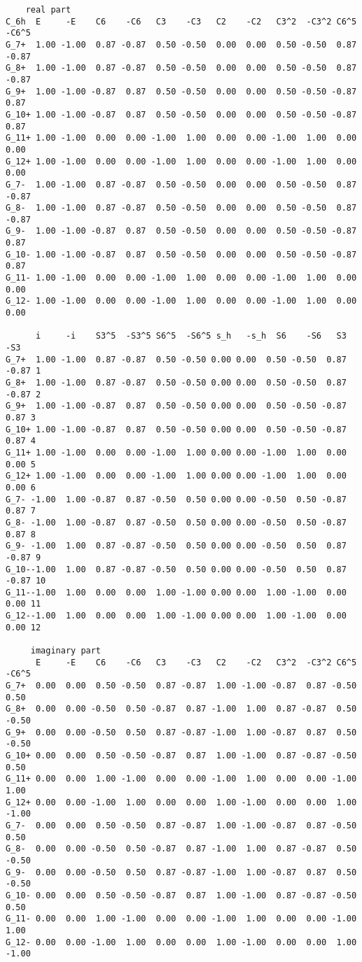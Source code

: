 \documentclass[12pt,a4paper,twoside]{report}
\begin{document}
\begin{tcolorbox}
\begin{scriptsize}
\begin{verbatim}
    real part
C_6h  E     -E    C6    -C6   C3    -C3   C2    -C2   C3^2  -C3^2 C6^5  -C6^5
G_7+  1.00 -1.00  0.87 -0.87  0.50 -0.50  0.00  0.00  0.50 -0.50  0.87 -0.87
G_8+  1.00 -1.00  0.87 -0.87  0.50 -0.50  0.00  0.00  0.50 -0.50  0.87 -0.87
G_9+  1.00 -1.00 -0.87  0.87  0.50 -0.50  0.00  0.00  0.50 -0.50 -0.87  0.87
G_10+ 1.00 -1.00 -0.87  0.87  0.50 -0.50  0.00  0.00  0.50 -0.50 -0.87  0.87
G_11+ 1.00 -1.00  0.00  0.00 -1.00  1.00  0.00  0.00 -1.00  1.00  0.00  0.00
G_12+ 1.00 -1.00  0.00  0.00 -1.00  1.00  0.00  0.00 -1.00  1.00  0.00  0.00
G_7-  1.00 -1.00  0.87 -0.87  0.50 -0.50  0.00  0.00  0.50 -0.50  0.87 -0.87
G_8-  1.00 -1.00  0.87 -0.87  0.50 -0.50  0.00  0.00  0.50 -0.50  0.87 -0.87
G_9-  1.00 -1.00 -0.87  0.87  0.50 -0.50  0.00  0.00  0.50 -0.50 -0.87  0.87
G_10- 1.00 -1.00 -0.87  0.87  0.50 -0.50  0.00  0.00  0.50 -0.50 -0.87  0.87
G_11- 1.00 -1.00  0.00  0.00 -1.00  1.00  0.00  0.00 -1.00  1.00  0.00  0.00
G_12- 1.00 -1.00  0.00  0.00 -1.00  1.00  0.00  0.00 -1.00  1.00  0.00  0.00

      i     -i    S3^5  -S3^5 S6^5  -S6^5 s_h   -s_h  S6    -S6   S3    -S3
G_7+  1.00 -1.00  0.87 -0.87  0.50 -0.50 0.00 0.00  0.50 -0.50  0.87 -0.87 1
G_8+  1.00 -1.00  0.87 -0.87  0.50 -0.50 0.00 0.00  0.50 -0.50  0.87 -0.87 2
G_9+  1.00 -1.00 -0.87  0.87  0.50 -0.50 0.00 0.00  0.50 -0.50 -0.87  0.87 3
G_10+ 1.00 -1.00 -0.87  0.87  0.50 -0.50 0.00 0.00  0.50 -0.50 -0.87  0.87 4
G_11+ 1.00 -1.00  0.00  0.00 -1.00  1.00 0.00 0.00 -1.00  1.00  0.00  0.00 5
G_12+ 1.00 -1.00  0.00  0.00 -1.00  1.00 0.00 0.00 -1.00  1.00  0.00  0.00 6
G_7- -1.00  1.00 -0.87  0.87 -0.50  0.50 0.00 0.00 -0.50  0.50 -0.87  0.87 7
G_8- -1.00  1.00 -0.87  0.87 -0.50  0.50 0.00 0.00 -0.50  0.50 -0.87  0.87 8
G_9- -1.00  1.00  0.87 -0.87 -0.50  0.50 0.00 0.00 -0.50  0.50  0.87 -0.87 9
G_10--1.00  1.00  0.87 -0.87 -0.50  0.50 0.00 0.00 -0.50  0.50  0.87 -0.87 10
G_11--1.00  1.00  0.00  0.00  1.00 -1.00 0.00 0.00  1.00 -1.00  0.00  0.00 11
G_12--1.00  1.00  0.00  0.00  1.00 -1.00 0.00 0.00  1.00 -1.00  0.00  0.00 12

     imaginary part
      E     -E    C6    -C6   C3    -C3   C2    -C2   C3^2  -C3^2 C6^5  -C6^5
G_7+  0.00  0.00  0.50 -0.50  0.87 -0.87  1.00 -1.00 -0.87  0.87 -0.50  0.50
G_8+  0.00  0.00 -0.50  0.50 -0.87  0.87 -1.00  1.00  0.87 -0.87  0.50 -0.50
G_9+  0.00  0.00 -0.50  0.50  0.87 -0.87 -1.00  1.00 -0.87  0.87  0.50 -0.50
G_10+ 0.00  0.00  0.50 -0.50 -0.87  0.87  1.00 -1.00  0.87 -0.87 -0.50  0.50
G_11+ 0.00  0.00  1.00 -1.00  0.00  0.00 -1.00  1.00  0.00  0.00 -1.00  1.00
G_12+ 0.00  0.00 -1.00  1.00  0.00  0.00  1.00 -1.00  0.00  0.00  1.00 -1.00
G_7-  0.00  0.00  0.50 -0.50  0.87 -0.87  1.00 -1.00 -0.87  0.87 -0.50  0.50
G_8-  0.00  0.00 -0.50  0.50 -0.87  0.87 -1.00  1.00  0.87 -0.87  0.50 -0.50
G_9-  0.00  0.00 -0.50  0.50  0.87 -0.87 -1.00  1.00 -0.87  0.87  0.50 -0.50
G_10- 0.00  0.00  0.50 -0.50 -0.87  0.87  1.00 -1.00  0.87 -0.87 -0.50  0.50
G_11- 0.00  0.00  1.00 -1.00  0.00  0.00 -1.00  1.00  0.00  0.00 -1.00  1.00
G_12- 0.00  0.00 -1.00  1.00  0.00  0.00  1.00 -1.00  0.00  0.00  1.00 -1.00


\end{verbatim}
\end{scriptsize}
\end{tcolorbox}
\end{document}
